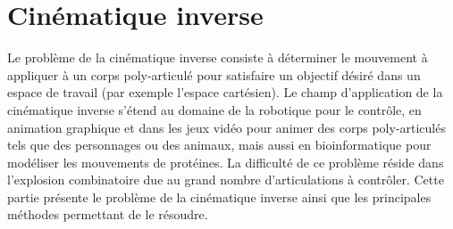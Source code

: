 \section{Cinématique inverse}
\label{sec:inversekine}
Le problème de la cinématique inverse consiste à déterminer le mouvement à appliquer à
un corps poly-articulé pour satisfaire un objectif désiré dans un espace de travail (par exemple
l'espace cartésien).
Le champ d'application de la cinématique inverse s'étend au domaine de la robotique
pour le contr\^ole, en animation graphique et dans les jeux vidéo pour animer
des corps poly-articulés tels que des personnages ou des animaux, mais aussi
en bioinformatique pour modéliser les mouvements de protéines. La difficulté
de ce problème réside dans l'explosion combinatoire due au grand nombre
d'articulations à contrôler. Cette partie présente le problème de la cinématique inverse
ainsi que les principales méthodes permettant de le résoudre.

